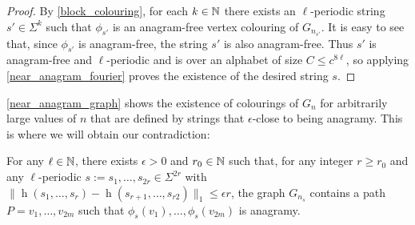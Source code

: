 \documentclass{patmorin}
\DeclareMathOperator{\hist}{h}
\begin{document}
\begin{proof}
    By \cref{block_colouring}, for each $k\in\mathbb{N}$ there exists an $\ell$-periodic string $s'\in\Sigma^k$ such that $\phi_{s'}$ is an anagram-free vertex colouring of $G_{n_{s'}}$.  It is easy to see that, since $\phi_{s'}$ is anagram-free, the string $s'$ is also anagram-free.
    Thus $s'$ is anagram-free and $\ell$-periodic and is over an alphabet of size $C\le c^{8\ell}$, so applying \cref{near_anagram_fourier} proves the existence of the desired string $s$.
\end{proof}

\cref{near_anagram_graph} shows the existence of colourings of $G_n$ for arbitrarily large values of $n$ that are defined by strings that $\epsilon$-close to being anagramy.  This is where we will obtain our contradiction:

\begin{lem}
    For any $\ell\in\mathbb{N}$, there exists $\epsilon>0$ and $r_0\in\mathbb{N}$ such that, for any integer $r\ge r_0$ and any $\ell$-periodic $s:=s_1,\ldots,s_{2r}\in\Sigma^{2r}$ with $\|\hist(s_1,\ldots,s_r)-\hist(s_{r+1},\ldots,s_{r2})\|_1\le\epsilon r$, the graph $G_{n_s}$ contains a path $P=v_1,\ldots,v_{2m}$ such that $\phi_s(v_1),\ldots,\phi_s(v_{2m})$ is anagramy.
\end{lem}
\end{document}
